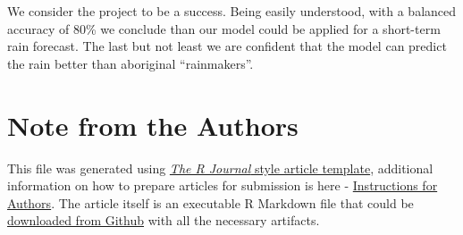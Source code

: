We consider the project to be a success. Being easily understood, with a
balanced accuracy of 80\% we conclude than our model could be applied
for a short-term rain forecast. The last but not least we are confident
that the model can predict the rain better than aboriginal
``rainmakers''. \newpage



\hypertarget{note-from-the-authors}{%
\section{Note from the Authors}\label{note-from-the-authors}}

This file was generated using
\href{https://github.com/rstudio/rticles}{\emph{The R Journal} style
article template}, additional information on how to prepare articles for
submission is here -
\href{https://journal.r-project.org/share/author-guide.pdf}{Instructions
for Authors}. The article itself is an executable R Markdown file that
could be
\href{https://github.com/ivbsoftware/big-data-final-2/blob/master/docs/R_Journal/big-data-final-2/}{downloaded
from Github} with all the necessary artifacts.


\address{%
Sumaira Afzal\\
York University School of Continuing Studies\\
\\
}


\address{%
Viraja Ketkar\\
York University School of Continuing Studies\\
\\
}


\address{%
Murlidhar Loka\\
York University School of Continuing Studies\\
\\
}


\address{%
Vadim Spirkov\\
York University School of Continuing Studies\\
\\
}


